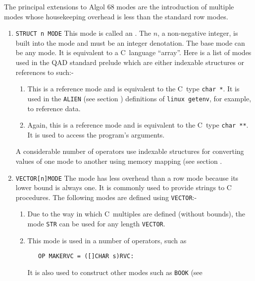 The principal extensions to Algol 68 modes are the introduction of
multiple modes whose housekeeping overhead is less than the standard
row modes.
\begin{enumerate}
\item \verb|STRUCT n MODE|\newline
This mode is called an .  The $n$, a non-negative integer, is built into the mode
and must be an integer denotation. The base mode can be any mode. It
is equivalent to a C~language ``array''.  Here is a list of modes
used in the QAD standard prelude which are either indexable
structures or references to such:-
\begin{enumerate}
\item {}\newline
This is a reference mode and is equivalent to the C~type \verb|char *|.
It is used in the \verb|ALIEN| (see section )
definitions of \verb|linux getenv|, for example, to reference
data.
\item {}\newline
Again, this is a reference mode and is equivalent to the C~type
\verb|char **|. It is used to access the program's arguments.
\end{enumerate}
A considerable number of operators use indexable structures for
converting values of one mode to another using memory mapping (see
section .
\item \verb|VECTOR[n]MODE| \newline
The  mode has less overhead than a row mode because its
lower bound is always one. It is commonly used to provide strings to
C procedures. The following modes are defined using \verb|VECTOR|:-
\begin{enumerate}
\item {}\newline
Due to the way in which C~multiples are defined (without bounds), the
mode \verb|STR| can be used for any length \verb|VECTOR|.
\item {}\newline
This mode is used in a number of operators, such as
\begin{verbatim}
   OP MAKERVC = ([]CHAR s)RVC:
\end{verbatim}
\noindent
It is also used to construct other modes such as \verb|BOOK| (see

\end{enumerate}
\end{enumerate}
